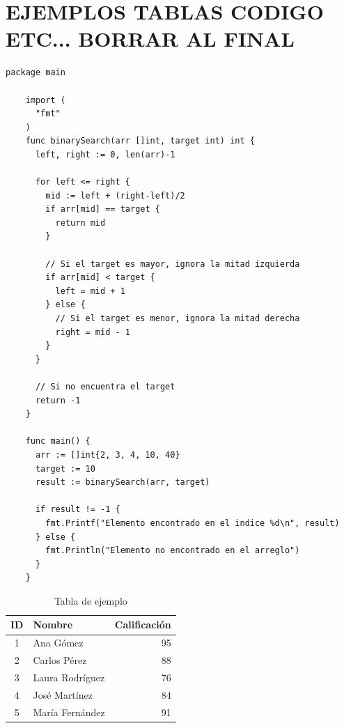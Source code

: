 \documentclass[letterpaper,10pt]{article}
\begin{document}
\section{EJEMPLOS TABLAS CODIGO ETC... BORRAR AL FINAL}
\begin{lstlisting}[caption={Algoritmo de búsqueda binaria en Go}, label={lst:binary_search}]
    package main
    
    import (
      "fmt"
    )
    func binarySearch(arr []int, target int) int {
      left, right := 0, len(arr)-1
      
      for left <= right {
        mid := left + (right-left)/2
        if arr[mid] == target {
          return mid
        }
        
        // Si el target es mayor, ignora la mitad izquierda
        if arr[mid] < target {
          left = mid + 1
        } else {
          // Si el target es menor, ignora la mitad derecha
          right = mid - 1
        }
      }
      
      // Si no encuentra el target
      return -1
    }
    
    func main() {
      arr := []int{2, 3, 4, 10, 40}
      target := 10
      result := binarySearch(arr, target)
      
      if result != -1 {
        fmt.Printf("Elemento encontrado en el indice %d\n", result)
      } else {
        fmt.Println("Elemento no encontrado en el arreglo")
      }
    }
\end{lstlisting}

\begin{table}[H]
    \centering
    \begin{tabular}{|c|l|r|}
      \hline
      \textbf{ID} & \textbf{Nombre} & \textbf{Calificación} \\ \hline
      1 & Ana Gómez & 95 \\ \hline
      2 & Carlos Pérez & 88 \\ \hline
      3 & Laura Rodríguez & 76 \\ \hline
      4 & José Martínez & 84 \\ \hline
      5 & María Fernández & 91 \\ \hline
    \end{tabular}
    \caption{Tabla de ejemplo}
    \label{tab:ejemplo}
\end{table}
\end{document}
